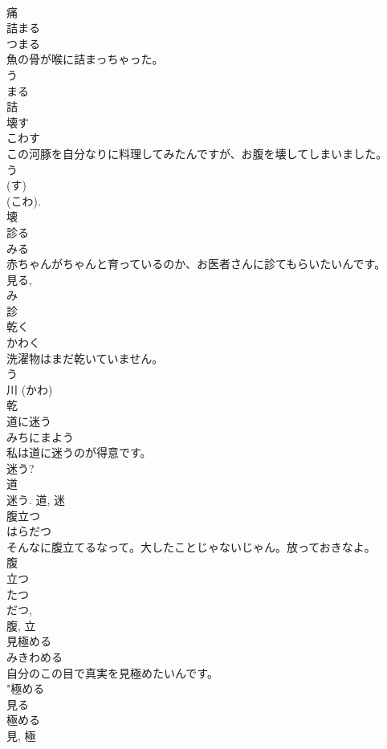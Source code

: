 \documentclass[8pt]{extreport}
\begin{document}
\begin{CJK}{UTF8}{min}
\\	痛	
\\	詰まる	
\\	つまる	
\\	魚の骨が喉に詰まっちゃった。	
\\	う 
\\	まる 
\\	詰	
\\	壊す	
\\	こわす	
\\	この河豚を自分なりに料理してみたんですが、お腹を壊してしまいました。	
\\	う 
\\	(す) 
\\	(こわ). 
\\	壊	
\\	診る	
\\	みる	
\\	赤ちゃんがちゃんと育っているのか、お医者さんに診てもらいたいんです。	
\\	見る, 
\\	み 
\\	診	
\\	乾く	
\\	かわく	
\\	洗濯物はまだ乾いていません。	
\\	う 
\\	川 (かわ) 
\\	乾	
\\	道に迷う	
\\	みちにまよう	
\\	私は道に迷うのが得意です。	
\\	迷う? 
\\	道 
\\	迷う.	道, 迷	
\\	腹立つ	
\\	はらだつ	
\\	そんなに腹立てるなって。大したことじゃないじゃん。放っておきなよ。	
\\	腹 
\\	立つ 
\\	たつ 
\\	だつ, 
\\	腹, 立	
\\	見極める	
\\	みきわめる	
\\	自分のこの目で真実を見極めたいんです。	
\\	"極める 
\\	見る 
\\	極める 
\\	見, 極	

\end{CJK}
\end{document}
